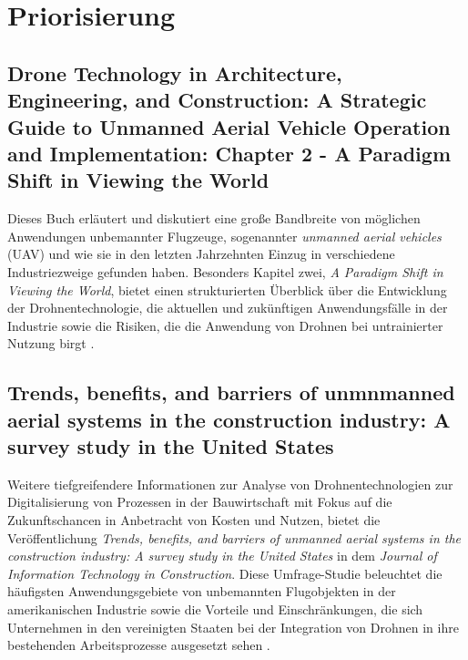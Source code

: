 \chapter{Priorisierung}\label{ch:priorisation}

\section{Drone Technology in Architecture, Engineering, and Construction: A Strategic Guide to Unmanned Aerial Vehicle Operation and Implementation: Chapter 2 - A Paradigm Shift in Viewing the World}

Dieses Buch erläutert und diskutiert eine große Bandbreite von möglichen Anwendungen unbemannter Flugzeuge, sogenannter \textit{unmanned aerial vehicles} (UAV) und wie sie in den letzten Jahrzehnten Einzug in verschiedene Industriezweige gefunden haben.
Besonders Kapitel zwei, \textit{A Paradigm Shift in Viewing the World}, bietet einen strukturierten Überblick über die Entwicklung der Drohnentechnologie, die aktuellen und zukünftigen Anwendungsfälle in der Industrie sowie die Risiken, die die Anwendung von Drohnen bei untrainierter Nutzung birgt \cite{Tal2021}.

\section{Trends, benefits, and barriers of unmnmanned aerial systems in the construction industry: A survey study in the United States}

Weitere tiefgreifendere Informationen zur Analyse von Drohnentechnologien zur Digitalisierung von Prozessen in der Bauwirtschaft mit Fokus auf die Zukunftschancen in Anbetracht von Kosten und Nutzen, bietet die Veröffentlichung \textit{Trends, benefits, and barriers of unmanned aerial systems in the construction industry: A survey study in the United States} in dem \textit{Journal of Information Technology in Construction}.
Diese Umfrage-Studie beleuchtet die häufigsten Anwendungsgebiete von unbemannten Flugobjekten in der amerikanischen Industrie sowie die Vorteile und Einschränkungen, die sich Unternehmen in den vereinigten Staaten bei der Integration von Drohnen in ihre bestehenden Arbeitsprozesse ausgesetzt sehen \cite{abaeano2021trends}.